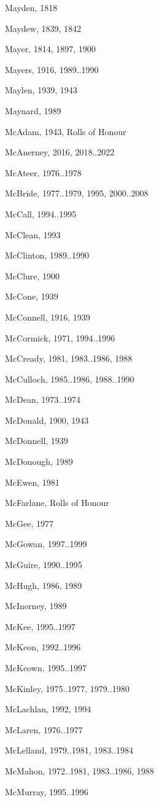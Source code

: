 \begin{theindex}
\item Mayden, 1818
\item Maydew, 1839, 1842
\item Mayer, 1814, 1897, 1900
\item Mayers, 1916, 1989..1990
\item Maylen, 1939, 1943
\item Maynard, 1989
\item McAdam, 1943, Rolls of Honour
\item McAnerney, 2016, 2018..2022
\item McAteer, 1976..1978
\item McBride, 1977..1979, 1995, 2000..2008
\item McCall, 1994..1995
\item McClean, 1993
\item McClinton, 1989..1990
\item McClure, 1900
\item McCone, 1939
\item McConnell, 1916, 1939
\item McCormick, 1971, 1994..1996
\item McCready, 1981, 1983..1986, 1988
\item McCulloch, 1985..1986, 1988..1990
\item McDean, 1973..1974
\item McDonald, 1900, 1943
\item McDonnell, 1939
\item McDonough, 1989
\item McEwen, 1981
\item McFarlane, Rolls of Honour
\item McGee, 1977
\item McGowan, 1997..1999
\item McGuire, 1990..1995
\item McHugh, 1986, 1989
\item McInerney, 1989
\item McKee, 1995..1997
\item McKeon, 1992..1996
\item McKeown, 1995..1997
\item McKinley, 1975..1977, 1979..1980
\item McLachlan, 1992, 1994
\item McLaren, 1976..1977
\item McLelland, 1979..1981, 1983..1984
\item McMahon, 1972..1981, 1983..1986, 1988
\item McMurray, 1995..1996

\end{theindex}
